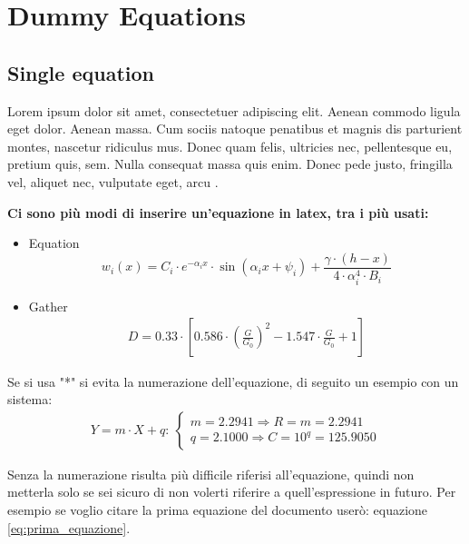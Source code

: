 
\chapter{Dummy Equations} %


\section{Single equation}

Lorem ipsum dolor sit amet, consectetuer adipiscing elit. Aenean commodo ligula eget dolor. Aenean massa. Cum sociis natoque penatibus et magnis dis parturient montes, nascetur ridiculus mus. Donec quam felis, ultricies nec, pellentesque eu, pretium quis, sem. Nulla consequat massa quis enim. Donec pede justo, fringilla vel, aliquet nec, vulputate eget, arcu \cite{ref1}.

\textbf{Ci sono più modi di inserire un'equazione in latex, tra i più usati:}
\begin{itemize}
    \item Equation
        \begin{equation}
            w_i (x) = C_i \cdot e^{-\alpha_i x}\cdot \sin{(\alpha_i x + \psi_i)} + \frac{\gamma\cdot (h-x)}{4\cdot \alpha_i^4 \cdot B_i}
            \label{eq:prima_equazione}
        \end{equation}
    \item Gather
        \begin{gather}
            D = 0.33\cdot \left[ 0.586\cdot \left( \frac{G}{G_0} \right) ^2 - 1.547 \cdot \frac{G}{G_0} + 1 \right]
        \end{gather}
\end{itemize}
Se si usa "*" si evita la numerazione dell'equazione, di seguito un esempio con un sistema:
\begin{gather*}
Y = m\cdot X + q:\ 
    \begin{cases}
        m = 2.2941 \Rightarrow R = m = 2.2941 \\
        q = 2.1000 \Rightarrow C = 10^q = 125.9050
    \end{cases}
\end{gather*}

Senza la numerazione risulta più difficile riferisi all'equazione, quindi non metterla solo se sei sicuro di non volerti riferire a quell'espressione in futuro. Per esempio se voglio citare la prima equazione del documento userò: equazione \eqref{eq:prima_equazione}.


